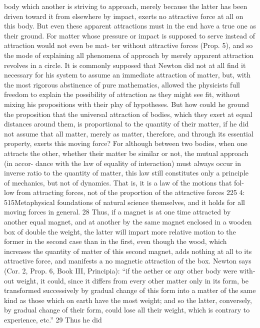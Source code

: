 body which another is striving to approach, merely because the latter
has been driven toward it from elsewhere by impact, exerts no attractive
force at all on this body. But even these apparent attractions must in
the end have a true one as their ground. For matter whose pressure or
impact is supposed to serve instead of attraction would not even be mat-
ter without attractive forces (Prop. 5), and so the mode of explaining all
phenomena of approach by merely apparent attraction revolves in a circle.
It is commonly supposed that Newton did not at all ﬁnd it necessary for
his system to assume an immediate attraction of matter, but, with the
most rigorous abstinence of pure mathematics, allowed the physicists
full freedom to explain the possibility of attraction as they might see ﬁt,
without mixing his propositions with their play of hypotheses. But how
could he ground the proposition that the universal attraction of bodies,
which they exert at equal distances around them, is proportional to the
quantity of their matter, if he did not assume that all matter, merely as
matter, therefore, and through its essential property, exerts this moving
force? For although between two bodies, when one attracts the other,
whether their matter be similar or not, the mutual approach (in accor-
dance with the law of equality of interaction) must always occur in inverse
ratio to the quantity of matter, this law still constitutes only a principle of
mechanics, but not of dynamics. That is, it is a law of the motions that fol-
low from attracting forces, not of the proportion of the attractive forces
225
4: 515Metaphysical foundations of natural science
themselves, and it holds for all moving forces in general. 28 Thus, if a
magnet is at one time attracted by another equal magnet, and at another
by the same magnet enclosed in a wooden box of double the weight, the
latter will impart more relative motion to the former in the second case
than in the ﬁrst, even though the wood, which increases the quantity of
matter of this second magnet, adds nothing at all to its attractive force,
and manifests a no magnetic attraction of the box. Newton says (Cor. 2,
Prop. 6, Book III, Principia): “if the aether or any other body were with-
out weight, it could, since it differs from every other matter only in its
form, be transformed successively by gradual change of this form into a
matter of the same kind as those which on earth have the most weight;
and so the latter, conversely, by gradual change of their form, could lose
all their weight, which is contrary to experience, etc.” 29 Thus he did
